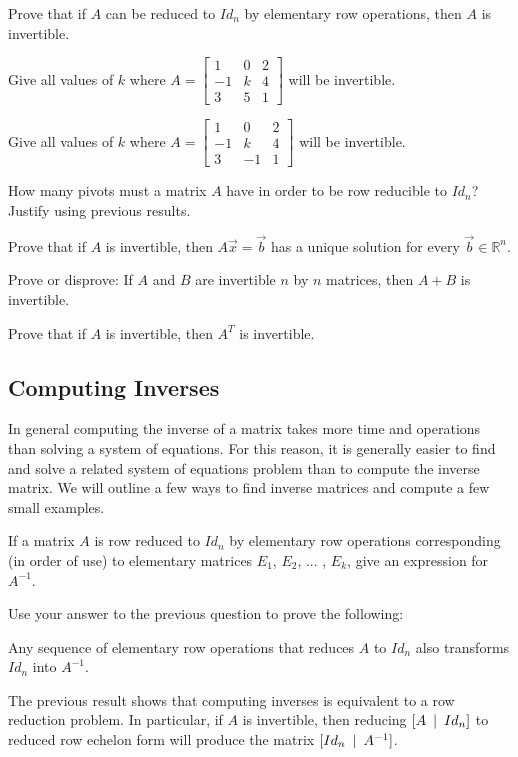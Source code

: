 \bq\label{q11} Prove that if $A$ can be reduced to $Id_n$ by elementary row operations, then $A$ is invertible.
\eq

\bq Give all values of $k$ where $A=\begin{bmatrix} 1&0&2\\-1&k&4\\3&5&1 \end{bmatrix}$ will be invertible.
\eq

\bq Give all values of $k$ where $A=\begin{bmatrix} 1&0&2\\-1&k&4\\3&-1&1 \end{bmatrix}$ will be invertible.
\eq

\bq How many pivots must a matrix $A$ have in order to be row reducible to $Id_n$? Justify using previous results.
\eq

\bq Prove that if $A$ is invertible, then $A\vec{x} =\vec{b}$ has a unique solution for every $\vec{b} \in \mathbb{R}^n$.
\eq

\bq Prove or disprove: If $A$ and $B$ are invertible $n$ by $n$ matrices, then $A+B$ is invertible.
\eq

\bq Prove that if $A$ is invertible, then $A^T$ is invertible.
\eq

\subsection{Computing Inverses}
In general computing the inverse of a matrix takes more time and operations than solving a system of equations. For this reason, it is generally easier to find and solve a related system of equations problem than to compute the inverse matrix. We will outline a few ways to find inverse matrices and compute a few small examples.

\bq If a matrix $A$ is row reduced to $Id_n$ by elementary row operations corresponding (in order of use) to elementary matrices $E_1$, $E_2$, ... , $E_k$, give an expression for $A^{-1}$.
\eq

\bq Use your answer to the previous question to prove the following:

Any sequence of elementary row operations that reduces $A$ to $Id_n$ also transforms $Id_n$ into $A^{-1}$.
\eq

The previous result shows that computing inverses is equivalent to a row reduction problem. In particular, if $A$ is invertible, then reducing $[ A \enskip | \enskip Id_n]$ to reduced row echelon form will produce the matrix $[ Id_n \enskip | \enskip A^{-1}]$.

